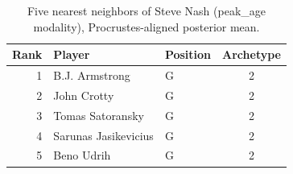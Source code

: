 \begin{table}[htbp]
  \centering\small
  \begin{tabular}{rllc}
    \toprule
    Rank & Player & Position & Archetype \\
    \midrule
    1 & B.J. Armstrong & G & 2 \\
    2 & John Crotty & G & 2 \\
    3 & Tomas Satoransky & G & 2 \\
    4 & Sarunas Jasikevicius & G & 2 \\
    5 & Beno Udrih & G & 2 \\
    \bottomrule
  \end{tabular}
  \caption{Five nearest neighbors of Steve Nash (peak_age modality), Procrustes-aligned posterior mean.}
  \label{tab:Steve_Nash_neighbors_peak_age}
\end{table}

